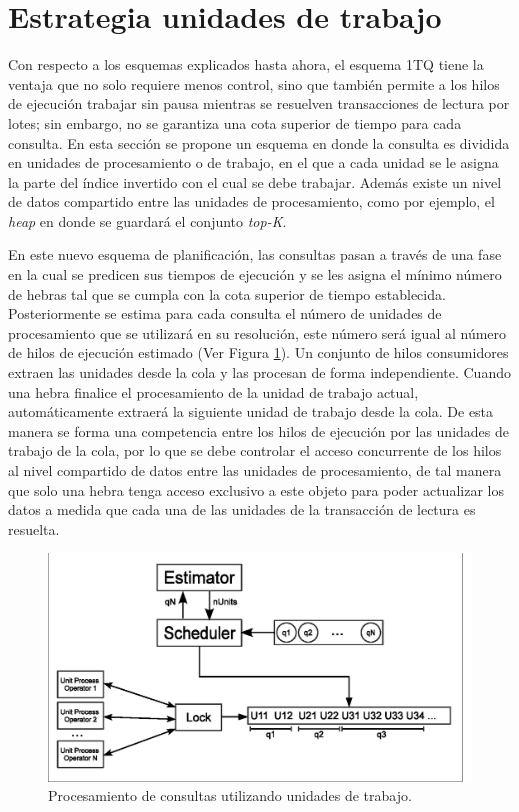 \section{Estrategia unidades de trabajo}
\label{scheduling:unidadestrabajo}
Con respecto a los esquemas explicados hasta ahora, el esquema 1TQ tiene la ventaja que no solo requiere menos control, sino que también permite a los hilos de ejecución trabajar sin pausa mientras se resuelven transacciones de lectura por lotes; sin embargo, no se garantiza una cota superior de tiempo para cada consulta. En esta sección se propone un esquema en donde la consulta es dividida en unidades de procesamiento o de trabajo, en el que a cada unidad se le asigna la parte del índice invertido con el cual se debe trabajar. Además existe un nivel de datos compartido entre las unidades de procesamiento, como por ejemplo, el \textit{heap} en donde se guardará el conjunto \textit{top-K}.

En este nuevo esquema de planificación, las consultas pasan a través de una fase en la cual se predicen sus tiempos de ejecución y se les asigna el mínimo número de hebras tal que se cumpla con la cota superior de tiempo establecida. Posteriormente se estima para cada consulta el número de unidades de procesamiento que se utilizará en su resolución, este número será igual al número de hilos de ejecución estimado (Ver Figura \ref{fig:unit_process}). Un conjunto de hilos consumidores extraen las unidades desde la cola y las procesan de forma independiente. Cuando una hebra finalice el procesamiento de la unidad de trabajo actual, automáticamente extraerá la siguiente unidad de trabajo desde la cola. De esta manera se forma una competencia entre los hilos de ejecución por las unidades de trabajo de la cola, por lo que se debe controlar el acceso concurrente de los hilos al nivel compartido de datos entre las unidades de procesamiento, de tal manera que solo una hebra tenga acceso exclusivo a este objeto para poder actualizar los datos a medida que cada una de las unidades de la transacción de lectura es resuelta.

\begin{figure}[!th]
\centering
\includegraphics[scale=.75]{images/unit_process.eps}
\caption{Procesamiento de consultas utilizando unidades de trabajo.}
\label{fig:unit_process}
\end{figure}

